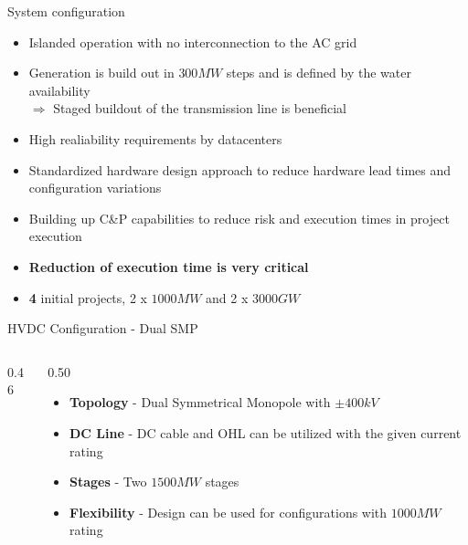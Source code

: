 \begin{frame}{System configuration}
  \begin{itemize}
    \setlength{\itemsep}{0.5em}
    \item Islanded operation with no interconnection to the AC grid
    \item Generation is build out in $300MW$ steps and is defined by the water availability \\ $\Rightarrow$ Staged buildout of the transmission line is beneficial
    \item High realiability requirements by datacenters
    \item Standardized hardware design approach to reduce hardware lead times and configuration variations
    \item Building up C\&P capabilities to reduce risk and execution times in project execution
    \item \textbf{Reduction of execution time is very critical}
    \item \textbf{4} initial projects, 2 x $1000MW$ and 2 x $3000GW$
  \end{itemize}
\end{frame}


\begin{frame}{HVDC Configuration - Dual SMP}
  \begin{columns}[c,onlytextwidth]
    \begin{column}{0.46\textwidth}
      \centering
    \end{column}
    \begin{column}{0.50\textwidth}
      \vspace{0.5em}
      \begin{itemize}
        \setlength{\itemsep}{0.7em}
        \item \textbf{Topology} - Dual Symmetrical Monopole with $\pm400kV$
        \item \textbf{DC Line} - DC cable and OHL can be utilized with the given current rating
        \item \textbf{Stages} - Two $1500MW$ stages
        \item \textbf{Flexibility} - Design can be used for configurations with $1000MW$ rating
      \end{itemize}
    \end{column}
  \end{columns}
\end{frame}


